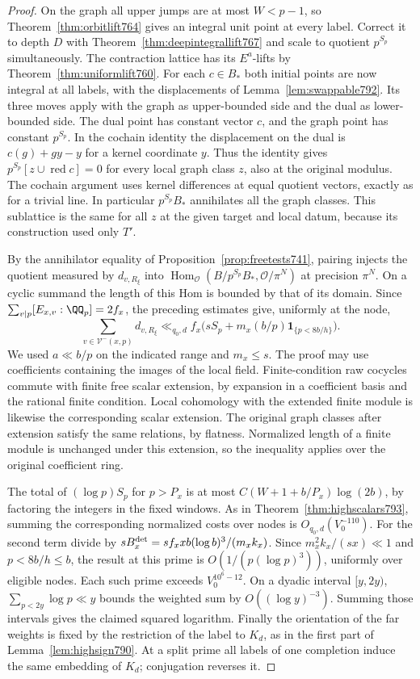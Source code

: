 \documentclass[a4paper,11pt]{article}
\theoremstyle{definition}
\theoremstyle{remark}
\numberwithin{equation}{section}
\begin{document}
\begin{proof}
On the graph all upper jumps are at most \(W<p-1\), so
Theorem~\ref{thm:orbitlift764} gives an integral unit point
at every label. Correct it to depth \(D\) with
Theorem~\ref{thm:deepintegrallift767} and scale to quotient
\(p^{S_p}\) simultaneously. The contraction lattice has its
\(E^a\)-lifts by Theorem~\ref{thm:uniformlift760}. For each
\(c\in B_*\) both initial points are now integral at all
labels, with the displacements of Lemma~\ref{lem:swappable792}.
Its three moves apply with the graph as upper-bounded side
and the dual as lower-bounded side. The dual point has
constant vector \(c\), and the graph point has constant
\(p^{S_p}\). In the cochain identity the displacement on
the dual is \(c(g)+gy-y\) for a kernel coordinate \(y\).
Thus the identity gives
\(p^{S_p}[z\cup\operatorname{red}c]=0\) for every local
graph class \(z\), also at the original modulus.
The cochain argument uses kernel differences at equal
quotient vectors, exactly as for a trivial line.
In particular \(p^{S_p}B_*\) annihilates all the graph
classes. This sublattice is the same for all \(z\) at
the given target and local datum, because its construction
used only \(T'\).

By the annihilator equality of Proposition~\ref{prop:freetests741},
pairing injects the quotient measured by \(d_{v,R_\xi}\)
into \(\operatorname{Hom}_{\mathcal O}(B/p^{S_p}B_*,
\mathcal O/\pi^N)\) at precision \(\pi^N\).
On a cyclic summand the length of this Hom is bounded
by that of its domain. Since \(\sum_{v\mid p} [E_{x,v}:\QQ_p]=2f_x\),
the preceding estimates give, uniformly at the node,
\[
  \sum_{v\in\mathcal V^-(x,p)}d_{v,R_\xi}
       \ll_{q_0,d} f_x\bigl(sS_p+
                   m_x (b/p)\mathbf 1_{\{p<8b/h\}}\bigr).
\]
We used \(a\ll b/p\) on the indicated range and \(m_x\le s\).
The proof may use coefficients containing the images of
the local field. Finite-condition raw cocycles commute
with finite free scalar extension, by expansion in a
coefficient basis and the rational finite condition.
Local cohomology with the extended finite module is
likewise the corresponding scalar extension. The original
graph classes after extension satisfy the same relations,
by flatness. Normalized length of a finite module is
unchanged under this extension, so the inequality applies
over the original coefficient ring.

The total of \((\log p)S_p\) for \(p>P_x\) is at most
\(C(W+1+b/P_x)\log(2b)\), by factoring the integers in
the fixed windows. As in Theorem~\ref{thm:highscalars793},
summing the corresponding normalized costs over nodes
is \(O_{q_0,d}(V_0^{-110})\). For the second term divide
by \(sB_x^{\rm det}=s f_x x b(\log b)^3/(m_x k_x)\).
Since \(m_x^2 k_x/(sx)\ll1\) and \(p<8b/h\le b\),
the result at this prime is \(O(1/(p(\log p)^3))\),
uniformly over eligible nodes. Each such prime exceeds
\(V_0^{10^6-12}\). On a dyadic interval \([y,2y)\),
\(\sum_{p<2y}\log p\ll y\) bounds the weighted sum by
\(O((\log y)^{-3})\). Summing those intervals gives the
claimed squared logarithm. Finally the orientation of the
far weights is fixed by the restriction of the label to
\(K_d\), as in the first part of Lemma~\ref{lem:highsign790}.
At a split prime all labels of one completion induce the
same embedding of \(K_d\); conjugation reverses it.
\end{proof}
\end{document}
